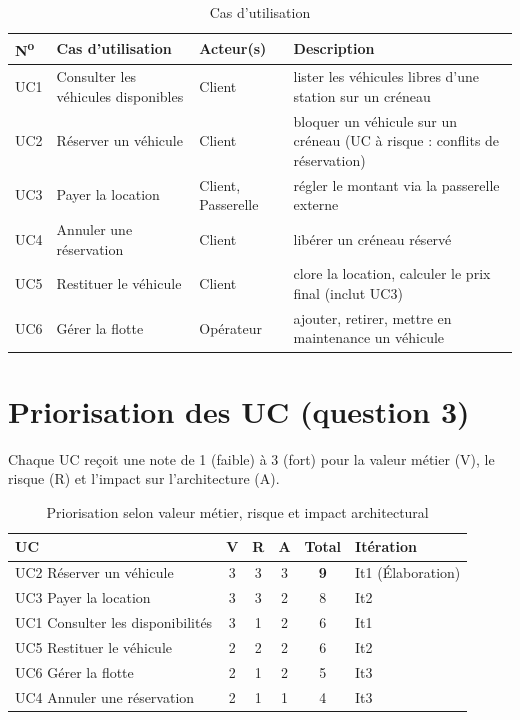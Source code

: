 \documentclass[11pt,a4paper]{article}
\begin{document}
\begin{table}[H]
\centering
\begin{tabularx}{\textwidth}{l l l L}
\toprule
\textbf{N\textsuperscript{o}} & \textbf{Cas d'utilisation} & \textbf{Acteur(s)} & \textbf{Description} \\
\midrule
UC1 & Consulter les véhicules disponibles & Client & lister les véhicules libres d'une station sur un créneau \\
UC2 & Réserver un véhicule & Client & bloquer un véhicule sur un créneau (UC à risque : conflits de réservation) \\
UC3 & Payer la location & Client, Passerelle & régler le montant via la passerelle externe \\
UC4 & Annuler une réservation & Client & libérer un créneau réservé \\
UC5 & Restituer le véhicule & Client & clore la location, calculer le prix final (inclut UC3) \\
UC6 & Gérer la flotte & Opérateur & ajouter, retirer, mettre en maintenance un véhicule \\
\bottomrule
\end{tabularx}
\caption{Cas d'utilisation}
\end{table}

\section{Priorisation des UC (question 3)}

Chaque UC reçoit une note de 1 (faible) à 3 (fort) pour la valeur métier (V), le
risque (R) et l'impact sur l'architecture (A).

\begin{table}[H]
\centering
\begin{tabular}{l c c c c l}
\toprule
\textbf{UC} & \textbf{V} & \textbf{R} & \textbf{A} & \textbf{Total} & \textbf{Itération} \\
\midrule
UC2 Réserver un véhicule          & 3 & 3 & 3 & \textbf{9} & It1 (Élaboration) \\
UC3 Payer la location             & 3 & 3 & 2 & 8 & It2 \\
UC1 Consulter les disponibilités  & 3 & 1 & 2 & 6 & It1 \\
UC5 Restituer le véhicule         & 2 & 2 & 2 & 6 & It2 \\
UC6 Gérer la flotte               & 2 & 1 & 2 & 5 & It3 \\
UC4 Annuler une réservation       & 2 & 1 & 1 & 4 & It3 \\
\bottomrule
\end{tabular}
\caption{Priorisation selon valeur métier, risque et impact architectural}
\end{table}
\end{document}
